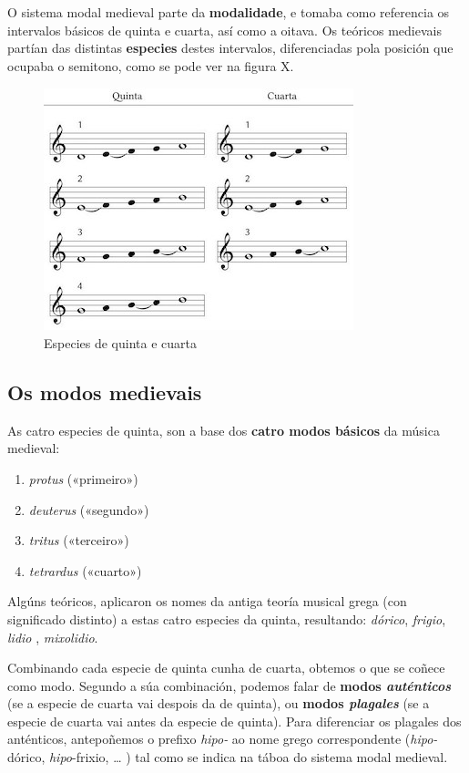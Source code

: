 \documentclass[a4paper, twoside]{templates/ociamthesis}
\providecommand{\tightlist}{%
  \setlength{\itemsep}{0pt}\setlength{\parskip}{0pt}}
\begin{document}
O sistema modal medieval parte da \textbf{modalidade}, e tomaba como referencia os intervalos básicos de quinta e cuarta, así como a oitava. Os teóricos medievais partían das distintas \textbf{especies} destes intervalos, diferenciadas pola posición que ocupaba o semitono, como se pode ver na figura X.

\begin{figure}
\centering
\includegraphics{figures/ud-03/especies.jpg}
\caption{Especies de quinta e cuarta}
\end{figure}

\hypertarget{os-modos-medievais}{%
\subsection{Os modos medievais}\label{os-modos-medievais}}

As catro especies de quinta, son a base dos \textbf{catro modos básicos} da música medieval:

\begin{enumerate}
\def\labelenumi{\arabic{enumi}.}
\tightlist
\item
  \emph{protus} («primeiro»)
\item
  \emph{deuterus} («segundo»)
\item
  \emph{tritus} («terceiro»)
\item
  \emph{tetrardus} («cuarto»)
\end{enumerate}

Algúns teóricos, aplicaron os nomes da antiga teoría musical grega (con significado distinto) a estas catro especies da quinta, resultando: \emph{dórico}, \emph{frigio}, \emph{lidio} , \emph{mixolidio}.

Combinando cada especie de quinta cunha de cuarta, obtemos o que se coñece como modo. Segundo a súa combinación, podemos falar de \textbf{modos \emph{auténticos}} (se a especie de cuarta vai despois da de quinta), ou \textbf{modos \emph{plagales}} (se a especie de cuarta vai antes da especie de quinta). Para diferenciar os plagales dos anténticos, antepoñemos o prefixo \emph{hipo-} ao nome grego correspondente (\emph{hipo-}dórico, \emph{hipo}-frixio, \ldots{} ) tal como se indica na táboa do sistema modal medieval.
\end{document}
